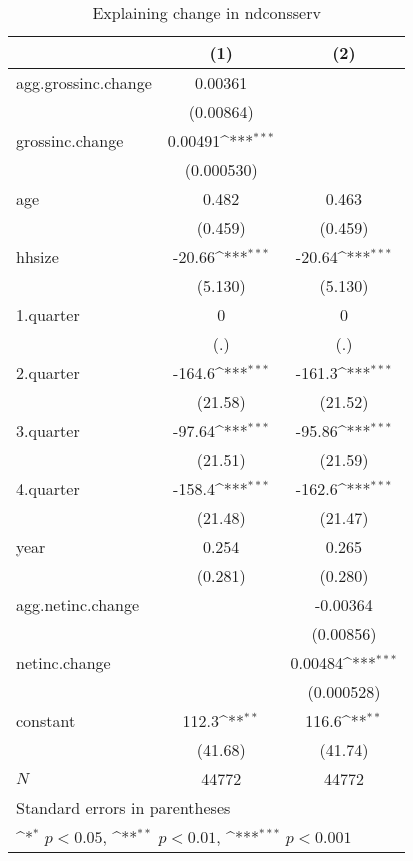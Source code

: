 \begin{table}[htbp]\centering
\def\sym#1{\ifmmode^{#1}\else\(^{#1}\)\fi}
\caption{\label{tab:ndconsserv-deltainc} Explaining change in ndconsserv}
\begin{tabular}{l*{2}{c}}
\hline\hline
            &\multicolumn{1}{c}{(1)}         &\multicolumn{1}{c}{(2)}         \\
\hline
agg.grossinc.change&     0.00361         &                     \\
            &   (0.00864)         &                     \\
grossinc.change&     0.00491\sym{***}&                     \\
            &  (0.000530)         &                     \\
age         &       0.482         &       0.463         \\
            &     (0.459)         &     (0.459)         \\
hhsize      &      -20.66\sym{***}&      -20.64\sym{***}\\
            &     (5.130)         &     (5.130)         \\
1.quarter   &           0         &           0         \\
            &         (.)         &         (.)         \\
2.quarter   &      -164.6\sym{***}&      -161.3\sym{***}\\
            &     (21.58)         &     (21.52)         \\
3.quarter   &      -97.64\sym{***}&      -95.86\sym{***}\\
            &     (21.51)         &     (21.59)         \\
4.quarter   &      -158.4\sym{***}&      -162.6\sym{***}\\
            &     (21.48)         &     (21.47)         \\
year        &       0.254         &       0.265         \\
            &     (0.281)         &     (0.280)         \\
agg.netinc.change&                     &    -0.00364         \\
            &                     &   (0.00856)         \\
netinc.change&                     &     0.00484\sym{***}\\
            &                     &  (0.000528)         \\
constant    &       112.3\sym{**} &       116.6\sym{**} \\
            &     (41.68)         &     (41.74)         \\
\hline
\(N\)       &       44772         &       44772         \\
\hline\hline
\multicolumn{3}{l}{\footnotesize Standard errors in parentheses}\\
\multicolumn{3}{l}{\footnotesize \sym{*} \(p<0.05\), \sym{**} \(p<0.01\), \sym{***} \(p<0.001\)}\\
\end{tabular}
\end{table}

